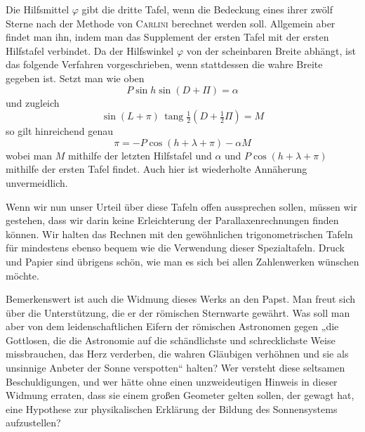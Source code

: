 Die Hilfsmittel $\varphi$ gibt die dritte Tafel, wenn die Bedeckung eines ihrer zwölf Sterne nach der Methode von \textsc{Carlini} berechnet werden soll. Allgemein aber findet man ihn, indem man das Supplement der ersten Tafel mit der ersten Hilfstafel verbindet. Da der Hilfswinkel $\varphi$ von der scheinbaren Breite abhängt, ist das folgende Verfahren vorgeschrieben, wenn stattdessen die wahre Breite gegeben ist. Setzt man wie oben
\[
P \sin h \sin(D+\Pi) = \alpha
\]
und zugleich
\[
\sin(L+\pi)\,\operatorname{tang}\tfrac{1}{2}(D+\tfrac{1}{2}\Pi) = M
\]
so gilt hinreichend genau
\[
\pi = -P\cos(h+\lambda+\pi) - \alpha M
\]
wobei man $M$ mithilfe der letzten Hilfstafel und $\alpha$ und $P\cos(h+\lambda+\pi)$ mithilfe der ersten Tafel findet. Auch hier ist wiederholte Annäherung unvermeidlich.

Wenn wir nun unser Urteil über diese Tafeln offen aussprechen sollen, müssen wir gestehen, dass wir darin keine Erleichterung der Parallaxenrechnungen finden können. Wir halten das Rechnen mit den gewöhnlichen trigonometrischen Tafeln für mindestens ebenso bequem wie die Verwendung dieser Spezialtafeln. Druck und Papier sind übrigens schön, wie man es sich bei allen Zahlenwerken wünschen möchte.

Bemerkenswert ist auch die Widmung dieses Werks an den Papst. Man freut sich über die Unterstützung, die er der römischen Sternwarte gewährt. Was soll man aber von dem leidenschaftlichen Eifern der römischen Astronomen gegen „die Gottlosen, die die Astronomie auf die schändlichste und schrecklichste Weise missbrauchen, das Herz verderben, die wahren Gläubigen verhöhnen und sie als unsinnige Anbeter der Sonne verspotten“ halten? Wer versteht diese seltsamen Beschuldigungen, und wer hätte ohne einen unzweideutigen Hinweis in dieser Widmung erraten, dass sie einem großen Geometer gelten sollen, der gewagt hat, eine Hypothese zur physikalischen Erklärung der Bildung des Sonnensystems aufzustellen?
\par\clearpage\endgroup
